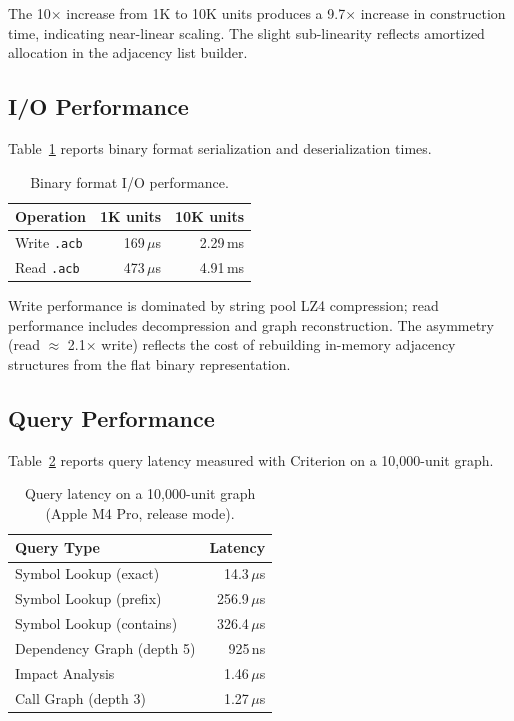 \documentclass[10pt, twocolumn]{article}
\newcommand{\acbfile}{\texttt{.acb}\xspace}
\begin{document}
The 10$\times$ increase from 1K to 10K units produces a 9.7$\times$ increase in construction time, indicating near-linear scaling. The slight sub-linearity reflects amortized allocation in the adjacency list builder.

\subsection{I/O Performance}

Table~\ref{tab:io} reports binary format serialization and deserialization times.

\begin{table}[t]
\caption{Binary format I/O performance.}
\label{tab:io}
\centering
\small
\begin{tabular}{@{}lrr@{}}
\toprule
\textbf{Operation} & \textbf{1K units} & \textbf{10K units} \\
\midrule
Write \acbfile & 169\,$\mu$s & 2.29\,ms \\
Read \acbfile  & 473\,$\mu$s & 4.91\,ms \\
\bottomrule
\end{tabular}
\end{table}

Write performance is dominated by string pool LZ4 compression; read performance includes decompression and graph reconstruction. The asymmetry (read $\approx$ 2.1$\times$ write) reflects the cost of rebuilding in-memory adjacency structures from the flat binary representation.

\subsection{Query Performance}

Table~\ref{tab:query} reports query latency measured with Criterion on a 10{,}000-unit graph.

\begin{table}[t]
\caption{Query latency on a 10{,}000-unit graph (Apple M4 Pro, release mode).}
\label{tab:query}
\centering
\small
\begin{tabular}{@{}lr@{}}
\toprule
\textbf{Query Type} & \textbf{Latency} \\
\midrule
Symbol Lookup (exact)      & 14.3\,$\mu$s \\
Symbol Lookup (prefix)     & 256.9\,$\mu$s \\
Symbol Lookup (contains)   & 326.4\,$\mu$s \\
Dependency Graph (depth 5) & 925\,ns \\
Impact Analysis            & 1.46\,$\mu$s \\
Call Graph (depth 3)       & 1.27\,$\mu$s \\
\bottomrule
\end{tabular}
\end{table}
\end{document}
